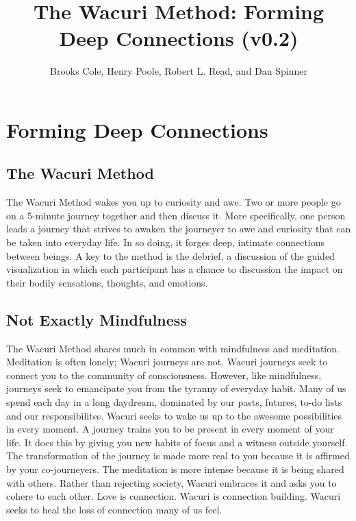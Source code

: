 \documentclass[12pt]{book}
\begin{document}
\title{The Wacuri Method: Forming Deep Connections (v0.2)}

\author{Brooks Cole, Henry Poole, Robert L. Read, and Dan Spinner}
\date{ }

\maketitle
\tableofcontents


\chapter{Forming Deep Connections}

\section{The Wacuri Method}
The Wacuri Method wakes you up to curiosity and awe.
Two or more people go on a 5-minute journey together and then discuss it.
More specifically, one person leads a journey that strives to awaken the
journeyer to awe and curiosity that can be taken into everyday life.
In so doing, it forges deep, intimate connections between beings.
A key to the method is the debrief, a discussion of the guided visualization
in which each participant has a chance to discussion the impact on their
bodily sensations, thoughts, and emotions.

\section{Not Exactly Mindfulness}

The Wacuri Method shares much in common with mindfulness and meditation.
Meditation is often lonely; Wacuri journeys are not. Wacuri journeys
seek to connect you to the community of consciousness. However,
like mindfulness, journeys seek to emancipate you from the tyranny
of everyday habit. Many of us spend each day in a long daydream, dominated
by our pasts, futures, to-do lists and our responsibilites. Wacuri seeks to wake
us up to the awesome possibilities in every moment. A journey trains you
to be present in every moment of your life. It does this by giving
you new habits of focus and
a witness outside yourself. The transformation of the journey
is made more real to you because it is affirmed by your co-journeyers.
The meditation is more intense because it is being shared with others.
Rather than rejecting society, Wacuri embraces it and asks you
to cohere to each other. Love is connection. Wacuri is
connection building. Wacuri seeks to heal the loss of connection
many of us feel.
\end{document}
